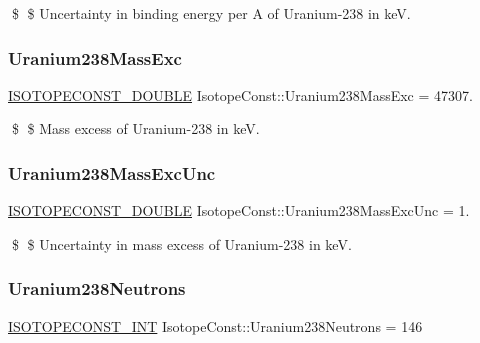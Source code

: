 \$ \$ Uncertainty in binding energy per A of Uranium-\/238 in keV. \mbox{\label{group___isotope_const-_uranium-_u238_ga21b6fa820a3aa6013058128cfe357e22}} 
\subsubsection{\texorpdfstring{Uranium238\+Mass\+Exc}{Uranium238MassExc}}
{\footnotesize\ttfamily \mbox{\hyperlink{group___isotope_const-_macros_ga8f45a7272ce02c0b4c65c44636ed719a}{I\+S\+O\+T\+O\+P\+E\+C\+O\+N\+S\+T\+\_\+\+D\+O\+U\+B\+LE}} Isotope\+Const\+::\+Uranium238\+Mass\+Exc = 47307.}

\$ \$ Mass excess of Uranium-\/238 in keV. \mbox{\label{group___isotope_const-_uranium-_u238_gaeb8286c90c528432a0923870bd13a8e6}} 
\subsubsection{\texorpdfstring{Uranium238\+Mass\+Exc\+Unc}{Uranium238MassExcUnc}}
{\footnotesize\ttfamily \mbox{\hyperlink{group___isotope_const-_macros_ga8f45a7272ce02c0b4c65c44636ed719a}{I\+S\+O\+T\+O\+P\+E\+C\+O\+N\+S\+T\+\_\+\+D\+O\+U\+B\+LE}} Isotope\+Const\+::\+Uranium238\+Mass\+Exc\+Unc = 1.}

\$ \$ Uncertainty in mass excess of Uranium-\/238 in keV. \mbox{\label{group___isotope_const-_uranium-_u238_gadf95924215ae26b622421d624d18d4ed}} 
\subsubsection{\texorpdfstring{Uranium238\+Neutrons}{Uranium238Neutrons}}
{\footnotesize\ttfamily \mbox{\hyperlink{group___isotope_const-_macros_ga5f18360b3e99483a35c32d789e62621c}{I\+S\+O\+T\+O\+P\+E\+C\+O\+N\+S\+T\+\_\+\+I\+NT}} Isotope\+Const\+::\+Uranium238\+Neutrons = 146}

